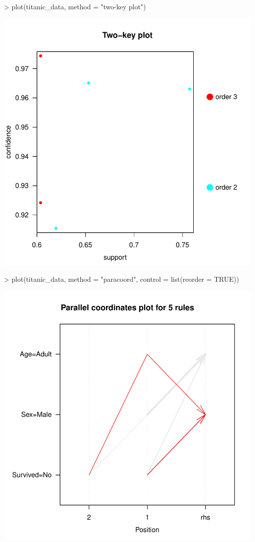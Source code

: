 \documentclass [a4paper] {article}
\begin{document}
\begin{center}
\begin{Schunk}
\begin{Sinput}
> plot(titanic_data, method = "two-key plot")
\end{Sinput}
\end{Schunk}
\includegraphics{entrega-grafica_apriori_titanic_data_two_key}
\begin{Schunk}
\begin{Sinput}
> plot(titanic_data, method = "paracoord", control = list(reorder = TRUE))
\end{Sinput}
\end{Schunk}
\includegraphics{entrega-grafica_apriori_titanic_data_paracoord}

\end{center}
\end{document}

